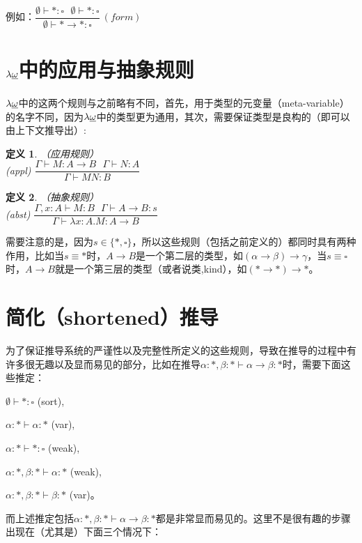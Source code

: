 \documentclass[UTF8]{article}
\newtheorem{thm}{定义}[section]
\begin{document}
		例如：$\dfrac{\emptyset\vdash*:\square\ \ \ \emptyset\vdash*:\square}{\emptyset\vdash*\rightarrow*:\square}\ (form)$
		
	\section{$\lambda{\uline{\omega}}$中的应用与抽象规则}
		\noindent
		$\lambda{\uline{\omega}}$中的这两个规则与之前略有不同，首先，用于类型的元变量（meta-variable）的名字不同，因为$\lambda{\uline{\omega}}$中的类型更为通用，其次，需要保证类型是良构的（即可以由上下文推导出）:
		
		\begin{thm}（应用规则）\\
			
			(appl) $\dfrac{\Gamma\vdash M:A\rightarrow B\ \ \ \Gamma\vdash N:A}{\Gamma\vdash MN:B}$
		\end{thm}
	
		\begin{thm}（抽象规则）\\
			
			(abst) $\dfrac{\Gamma,x:A\vdash M:B\ \ \ \Gamma\vdash A\rightarrow B:s}{\Gamma\vdash\lambda x:A.M:A\rightarrow B}$
		\end{thm}
	
		需要注意的是，因为$s\in\{*,\square\}$，所以这些规则（包括之前定义的）都同时具有两种作用，比如当$s\equiv*$时，$A\rightarrow B$是一个第二层的类型，如$(\alpha\rightarrow\beta)\rightarrow\gamma$，当$s\equiv\square$时，$A\rightarrow B$就是一个第三层的类型（或者说类,kind），如$(*\rightarrow*)\rightarrow*$。
		
	\section{简化（shortened）推导}
		\noindent
		为了保证推导系统的严谨性以及完整性所定义的这些规则，导致在推导的过程中有许多很无趣以及显而易见的部分，比如在推导$\alpha:*,\beta:*\vdash\alpha\rightarrow\beta:*$时，需要下面这些推定：
	
		$\emptyset\vdash*:\square$ (sort),
		
		$\alpha:*\vdash\alpha:*$ (var),
		
		$\alpha:*\vdash*:\square$ (weak),
		
		$\alpha:*,\beta:*\vdash\alpha:*$ (weak),
		
		$\alpha:*,\beta:*\vdash\beta:*$ (var)。
		
		而上述推定包括$\alpha:*,\beta:*\vdash\alpha\rightarrow\beta:*$都是非常显而易见的。这里不是很有趣的步骤出现在（尤其是）下面三个情况下：
		
\end{document}
